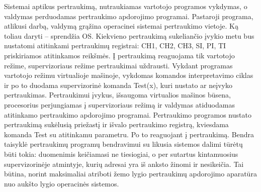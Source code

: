 Sistemai aptikus pertraukimą, nutraukiamas vartotojo programos vykdymas, o valdymas perduodamas pertraukimo apdorojimo programai. Pastaroji programa, atlikusi darbą, valdymą grąžina operacinei sistemai pertraukimo vietoje.  Ką toliau daryti – sprendžia OS. Kiekvieno pertraukimą sukeliančio įvykio metu bus nustatomi atitinkami pertraukimų registrai: CH1, CH2, CH3, SI, PI, TI priskiriamos atitinkamos reikšmės. 
Į pertraukimą reaguojama tik vartotojo režime, supervizoriaus režime pertraukimai uždrausti. Vykdant programas vartotojo režimu virtualioje mašinoje, vykdomas komandos interpretavimo ciklas ir po to duodama supervizorinė komanda Test(x), kuri  nustato ar neįvyko pertraukimas. 
Pertraukimui įvykus, išsaugoma virtualios mašinos būsena, procesorius perjungiamas į supervizoriaus režimą ir valdymas atiduodamas atitinkamo pertraukimo apdorojimo programai.
Pertraukimo programos nustato pertraukimą sukėlusią priežastį ir išvalo pertraukimo registrą, kviesdama komanda Test su atitinkamu parametru. Po  to reaguojant į pertraukimą.
Bendra taisyklė pertraukimų programų bendravimui su likusia sistemos dalimi tūrėtų būti tokia: duomenimis keičiamasi ne tiesiogiai, o per sutartus kintamuosius supervizorinėje atmintyje, kurių adresai yra iš anksto žinomi ir nesikeičia. Tai būtina, norint maksimaliai atriboti žemo lygio pertraukimų apdorojimo aparatūra nuo aukšto lygio operacinės sistemos.
   


